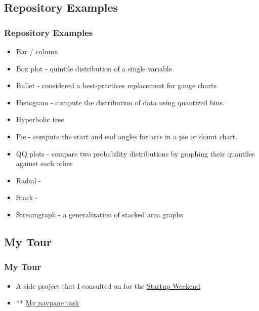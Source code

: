 \documentclass{beamer}
\begin{document}
\subsection{Repository Examples}

\begin{frame}
\frametitle{Repository Examples}
\begin{itemize}
\item Bar / column 
\item Box plot - quintile distribution of a single variable
\item Bullet - considered a best-practices replacement for gauge charts
\item Histogram - compute the distribution of data using quantized bins.
\item Hyperbolic tree
\item Pie - compute the start and end angles for arcs in a pie or donut chart.
\item QQ plots - compare two probability distributions by graphing their quantiles against each other
\item Radial - 
\item Stack - 
\item Streamgraph - a generalization of stacked area graphs
\end{itemize}
\end{frame}



\subsection{My Tour}

\begin{frame}
\frametitle{My Tour}
\begin{itemize}
\item A side project that I consulted on for the \href{http://www.startupweekendviz.johnmorefield.com/d3/examples/SW/map.html}{Startup Weekend}
\item ** \href{http://localhost:9000/examples/my_cisnet_demo/navpane.html}{My navpane task}
\end{itemize}
\end{frame}
\end{document}
